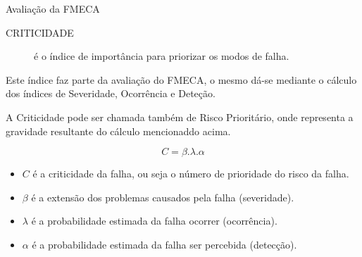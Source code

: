 \documentclass[aspectratio=169]{beamer}
\begin{document}
\begin{frame}[t]{Avaliação da FMECA}

    \begin{description}%
        \item[CRITICIDADE]é o índice de importância para priorizar os modos de falha.
    \end{description}
    \vspace{0.2cm}
    Este índice faz parte da avaliação do FMECA, o mesmo dá-se mediante o cálculo dos índices de Severidade, Ocorrência e Deteção.
    \vspace{0.2cm}

    A Criticidade pode ser chamada também de Risco Prioritário, onde representa a gravidade resultante do cálculo mencionaddo acima.
    \vspace{0.2cm}

    \begin{equation}
    \label{eq:criticidade}
        C = \beta . \lambda . \alpha
    \end{equation}

    \begin{itemize}
        \item $C$ é a criticidade da falha, ou seja o número de prioridade do risco da falha.
        \item $\beta$ é a extensão dos problemas causados pela falha (severidade).
        \item $\lambda$ é a probabilidade estimada da falha ocorrer (ocorrência).
        \item $\alpha$ é a probabilidade estimada da falha ser percebida (detecção).
    \end{itemize}
\end{frame}
\end{document}
